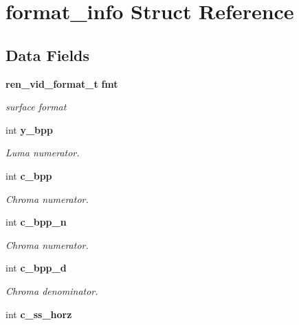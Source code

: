 \section{format\_\-info Struct Reference}
\label{structformat__info}
\subsection*{Data Fields}
\begin{DoxyCompactItemize}
\item 
{\bf ren\_\-vid\_\-format\_\-t} {\bf fmt}\label{structformat__info_a0bdeafb1db0a4364279860076fce8695}

\begin{DoxyCompactList}\small\item\em surface format \item\end{DoxyCompactList}\item 
int {\bf y\_\-bpp}\label{structformat__info_a653dc614616aff1f724da2cbfa417056}

\begin{DoxyCompactList}\small\item\em Luma numerator. \item\end{DoxyCompactList}\item 
int {\bf c\_\-bpp}\label{structformat__info_adb1de1160619fa90cc8d69c79c9b6989}

\begin{DoxyCompactList}\small\item\em Chroma numerator. \item\end{DoxyCompactList}\item 
int {\bf c\_\-bpp\_\-n}\label{structformat__info_a6d2bd25aa3d0c12b6ab66b19f88cbbb8}

\begin{DoxyCompactList}\small\item\em Chroma numerator. \item\end{DoxyCompactList}\item 
int {\bf c\_\-bpp\_\-d}\label{structformat__info_ae946c9baf5cbb923f4c085ed232d7826}

\begin{DoxyCompactList}\small\item\em Chroma denominator. \item\end{DoxyCompactList}\item 
int {\bf c\_\-ss\_\-horz}\label{structformat__info_a84897b9a93ed86c2c6c2e77ac84fd474}


\end{DoxyCompactItemize}
